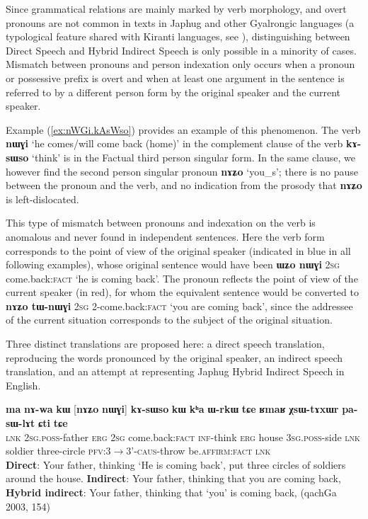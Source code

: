 \documentclass[oneside,a4paper,11pt]{article}
\newcommand{\ipa}[1]{\textbf{\phon#1}} %
\newcommand{\bleu}[1]{{\color{blue}#1}}
\newcommand{\rouge}[1]{{\color{red}#1}}
\newcommand{\refb}[1]{(\ref{#1})}
\begin{document}
Since grammatical relations are mainly marked by verb morphology, and overt pronouns 
are not common in texts in Japhug and other Gyalrongic languages (a typological feature shared with Kiranti languages, see \citealt{bickel01deictic}), distinguishing between Direct Speech and Hybrid Indirect Speech is only possible in a minority of cases. Mismatch between pronouns and person indexation only occurs when a pronoun or possessive prefix is overt and when at least one argument in the sentence is referred to by a different person form by the original speaker and the current speaker. 

Example \refb{ex:nWGi.kAsWso} provides an example of this phenomenon. The verb \ipa{nɯɣi} `he comes/will come back (home)' in the complement clause of the verb \ipa{kɤ-sɯso} `think' is in the Factual third person singular form. In the same clause, we however find the second person singular pronoun \ipa{nɤʑo} `you_s'; there is no pause between the pronoun and the verb, and no indication from the prosody that \ipa{nɤʑo} is left-dislocated. 

This type of mismatch between pronouns and indexation on the verb is anomalous and never found in independent sentences. Here the verb form corresponds to the point of view of the original speaker (indicated in blue in all following examples), whose original sentence would have been \ipa{ɯʑo nɯɣi} \textsc{2sg} {come.back:\textsc{fact}} `he is coming back'. The pronoun reflects the point of view of the current speaker (in red), for whom the equivalent sentence would be converted to \ipa{nɤʑo tɯ-nɯɣi} \textsc{2sg} {2-come.back:\textsc{fact}} `you are coming back', since the addressee of the current situation corresponds to the subject of the original situation.

Three distinct translations are proposed here: a direct speech translation, reproducing the words pronounced by the original speaker, an indirect speech translation, and an attempt at representing Japhug Hybrid Indirect Speech in English.

\begin{exe}
\ex \label{ex:nWGi.kAsWso}
\gll 
\ipa{ma} \ipa{nɤ-wa}  	\ipa{kɯ}  	[\rouge{\ipa{nɤʑo}} 	\bleu{\ipa{nɯɣi}}]  	\ipa{kɤ-sɯso}  	\ipa{kɯ}  	\ipa{kʰa}  	\ipa{ɯ-rkɯ} \ipa{tɕe} 	\ipa{ʁmaʁ}  	\ipa{χsɯ-tɤxɯr}  	\ipa{pa-sɯ-lɤt}  	\ipa{ɕti}  	\ipa{tɕe}  \\
\textsc{lnk} \textsc{2sg.poss}-father \textsc{erg} \textsc{2sg} {come.back:\textsc{fact}}  \textsc{inf}-think \textsc{erg} house \textsc{3sg.poss}-side \textsc{lnk} soldier three-circle \textsc{pfv:3$\rightarrow$3'-caus}-throw be.\textsc{affirm}:\textsc{fact} \textsc{lnk}\\
\glt \textbf{Direct}: Your father, thinking `\bleu{He is coming back}',   put three circles of soldiers around the house. 
\glt  \textbf{Indirect}: Your father, thinking that \rouge{you are coming back},
\glt  \textbf{Hybrid indirect}: Your father, thinking that `\rouge{you}' \bleu{is coming back}, (qachGa 2003, 154)
\end{exe}
   
\end{document}
